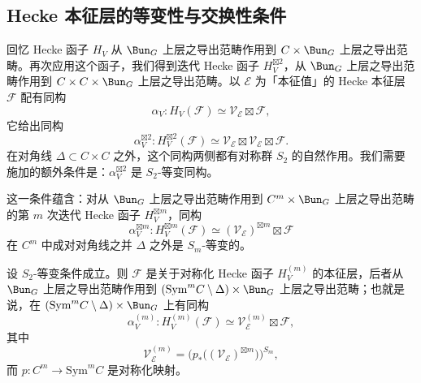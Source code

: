 \subsection{Hecke 本征层的等变性与交换性条件}

回忆 Hecke 函子 $H_V$ 从 $\Bun_G$ 上层之导出范畴作用到 $C\times \Bun_G$ 上层之导出范畴。再次应用这个函子，我们得到迭代 Hecke 函子 $H_V^{\boxtimes 2}$，从 $\Bun_G$ 上层之导出范畴作用到 $C\times C\times \Bun_G$ 上层之导出范畴。以 $\mathcal{E}$ 为「本征值」的 Hecke 本征层 $\mathcal{F}$ 配有同构
\[
\alpha_V : H_V(\mathcal{F}) \simeq \mathcal{V}_{\mathcal{E}} \boxtimes \mathcal{F},
\]
它给出同构
\[
\alpha_V^{\boxtimes 2} : H_V^{\boxtimes 2}(\mathcal{F}) \simeq \mathcal{V}_{\mathcal{E}} \boxtimes \mathcal{V}_{\mathcal{E}} \boxtimes \mathcal{F}.
\]
在对角线 $\Delta\subset C\times C$ 之外，这个同构两侧都有对称群 $S_2$ 的自然作用。我们需要施加的额外条件是：$\alpha_V^{\boxtimes 2}$ 是 $S_2$-等变同构。


这一条件蕴含：对从 $\Bun_G$ 上层之导出范畴作用到 $C^m\times \Bun_G$ 上层之导出范畴的第 $m$ 次迭代 Hecke 函子 $H_V^{\boxtimes m}$，同构
\[
\alpha_V^{\boxtimes m} : H_V^{\boxtimes m}(\mathcal{F}) \simeq (\mathcal{V}_{\mathcal{E}})^{\boxtimes m}\boxtimes \mathcal{F}
\]
在 $C^m$ 中成对对角线之并 $\Delta$ 之外是 $S_m$-等变的。


设 $S_2$-等变条件成立。则 $\mathcal{F}$ 是关于对称化 Hecke 函子 $H_V^{(m)}$ 的本征层，后者从 $\Bun_G$ 上层之导出范畴作用到 $(\mathrm{Sym}^m C\setminus\Delta)\times \Bun_G$ 上层之导出范畴；也就是说，在 $(\mathrm{Sym}^m C\setminus\Delta)\times \Bun_G$ 上有同构
\[
\alpha_V^{(m)} : H_V^{(m)}(\mathcal{F}) \simeq \mathcal{V}_{\mathcal{E}}^{(m)}\boxtimes \mathcal{F},
\]
其中
\begin{equation}\tag{8.4}
\mathcal{V}_{\mathcal{E}}^{(m)} = \bigl(p_*\bigl((\mathcal{V}_{\mathcal{E}})^{\boxtimes m}\bigr)\bigr)^{S_m},
\end{equation}
而 $p : C^m \to \mathrm{Sym}^m C$ 是对称化映射。

